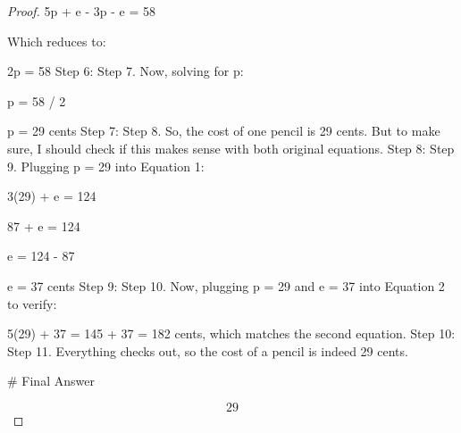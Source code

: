 \documentclass{article}
\begin{document}
\begin{proof}
        5p + e - 3p - e = 58

        Which reduces to:

        2p = 58
Step 6: Step 7. Now, solving for p:

        p = 58 / 2

        p = 29 cents
Step 7: Step 8. So, the cost of one pencil is 29 cents. But to make sure, I should check if this makes sense with both original equations.
Step 8: Step 9. Plugging p = 29 into Equation 1:

        3(29) + e = 124

        87 + e = 124

        e = 124 - 87

        e = 37 cents
Step 9: Step 10. Now, plugging p = 29 and e = 37 into Equation 2 to verify:

        5(29) + 37 = 145 + 37 = 182 cents, which matches the second equation.
Step 10: Step 11. Everything checks out, so the cost of a pencil is indeed 29 cents.

        # Final Answer

        \[\boxed{29}\]
\end{proof}
\end{document}
